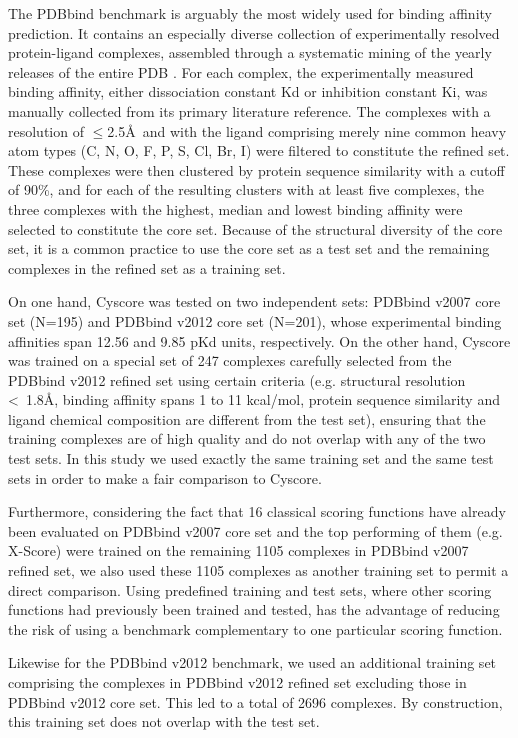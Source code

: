 \documentclass[twocolumn]{bmcart}
\begin{document}
The PDBbind \cite{529,530} benchmark is arguably the most widely used for binding affinity prediction. It contains an especially diverse collection of experimentally resolved protein-ligand complexes, assembled through a systematic mining of the yearly releases of the entire PDB \cite{540,537}. For each complex, the experimentally measured binding affinity, either dissociation constant Kd or inhibition constant Ki, was manually collected from its primary literature reference. The complexes with a resolution of $\le$2.5\AA\ and with the ligand comprising merely nine common heavy atom types (C, N, O, F, P, S, Cl, Br, I) were filtered to constitute the refined set. These complexes were then clustered by protein sequence similarity with a cutoff of 90\%, and for each of the resulting clusters with at least five complexes, the three complexes with the highest, median and lowest binding affinity were selected to constitute the core set. Because of the structural diversity of the core set, it is a common practice to use the core set as a test set and the remaining complexes in the refined set as a training set.

On one hand, Cyscore was tested on two independent sets: PDBbind v2007 core set (N=195) and PDBbind v2012 core set (N=201), whose experimental binding affinities span 12.56 and 9.85 pKd units, respectively. On the other hand, Cyscore was trained on a special set of 247 complexes carefully selected from the PDBbind v2012 refined set using certain criteria \cite{1372} (e.g. structural resolution \textless\ 1.8\AA, binding affinity spans 1 to 11 kcal/mol, protein sequence similarity and ligand chemical composition are different from the test set), ensuring that the training complexes are of high quality and do not overlap with any of the two test sets. In this study we used exactly the same training set and the same test sets in order to make a fair comparison to Cyscore.

Furthermore, considering the fact that 16 classical scoring functions have already been evaluated \cite{1313} on PDBbind v2007 core set and the top performing of them (e.g. X-Score) were trained on the remaining 1105 complexes in PDBbind v2007 refined set, we also used these 1105 complexes as another training set to permit a direct comparison. Using predefined training and test sets, where other scoring functions had previously been trained and tested, has the advantage of reducing the risk of using a benchmark complementary to one particular scoring function.

Likewise for the PDBbind v2012 benchmark, we used an additional training set comprising the complexes in PDBbind v2012 refined set excluding those in PDBbind v2012 core set. This led to a total of 2696 complexes. By construction, this training set does not overlap with the test set. %
\end{document}
